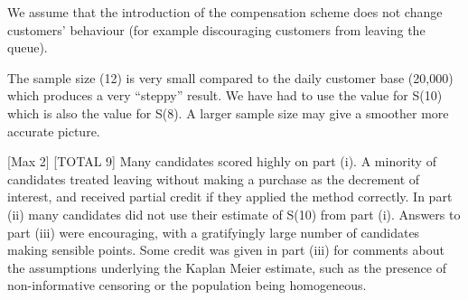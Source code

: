 \documentclass[a4paper,12pt]{article}
\begin{document}
We assume that the introduction of the compensation scheme does not change
customers’ behaviour (for example discouraging customers from leaving the queue).

The sample size (12) is very small compared to the daily customer base
(20,000) which produces a very “steppy” result. We have had to use the value for S(10) which is also the value for S(8). A larger sample size may give a
smoother more accurate picture.

[Max 2]
[TOTAL 9]
Many candidates scored highly on part (i). A minority of candidates treated leaving without making a purchase as the decrement of interest, and received partial credit if they applied the method correctly. In part (ii) many candidates
did not use their estimate of S(10) from part (i). Answers to part (iii) were encouraging, with a gratifyingly large number of candidates making sensible
points. Some credit was given in part (iii) for comments about the
assumptions underlying the Kaplan Meier estimate, such as the presence of
non-informative censoring or the population being homogeneous.
\end{document}
